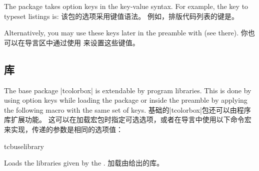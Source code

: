 \begin{dispListing}
\usepackage{tcolorbox}
\end{dispListing}


\begin{stripedbox}
The package takes option keys in the key-value syntax.%
For example, the key to typeset listings is:
\tcblower
该包的选项采用键值语法。%
例如，排版代码列表的键是。
\end{stripedbox}


\begin{dispListing}
\usepackage[listings]{tcolorbox}
\end{dispListing}

\begin{stripedbox}
Alternatively, you may use these keys later in the preamble with  (see there).
\tcblower
你也可以在导言区中通过使用  来设置这些键值。%
\end{stripedbox}


\subsection{库}\label{sec:bibliothek}

\begin{stripedbox}
The base package |tcolorbox| is extendable by program libraries.%
This is done by using option keys while loading the package or inside
the preamble by applying the following macro with the same set of keys.
\tcblower
基础的|tcolorbox|包还可以由程序库扩展功能。%
这可以在加载宏包时指定可选选项，或者在导言中使用以下命令宏来实现，传递的参数是相同的选项值：
\end{stripedbox}

\begin{docCommand}{tcbuselibrary}{}
\begin{stripedbox}
Loads the libraries given by the .
\tcblower
加载由\makebox[0pt]{~}\makebox[0pt]{~}给出的库。  
\end{stripedbox} 

\begin{dispListing}
\end{dispListing}


\end{docCommand}  

